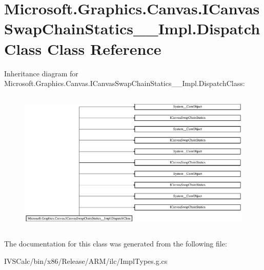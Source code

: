 \hypertarget{class_microsoft_1_1_graphics_1_1_canvas_1_1_i_canvas_swap_chain_statics_____impl_1_1_dispatch_class}{}\section{Microsoft.\+Graphics.\+Canvas.\+I\+Canvas\+Swap\+Chain\+Statics\+\_\+\+\_\+\+Impl.\+Dispatch\+Class Class Reference}
\label{class_microsoft_1_1_graphics_1_1_canvas_1_1_i_canvas_swap_chain_statics_____impl_1_1_dispatch_class}
Inheritance diagram for Microsoft.\+Graphics.\+Canvas.\+I\+Canvas\+Swap\+Chain\+Statics\+\_\+\+\_\+\+Impl.\+Dispatch\+Class\+:\begin{figure}[H]
\begin{center}
\leavevmode
\includegraphics[height=6.905830cm]{class_microsoft_1_1_graphics_1_1_canvas_1_1_i_canvas_swap_chain_statics_____impl_1_1_dispatch_class}
\end{center}
\end{figure}


The documentation for this class was generated from the following file\+:\begin{DoxyCompactItemize}
\item 
I\+V\+S\+Calc/bin/x86/\+Release/\+A\+R\+M/ilc/Impl\+Types.\+g.\+cs\end{DoxyCompactItemize}
